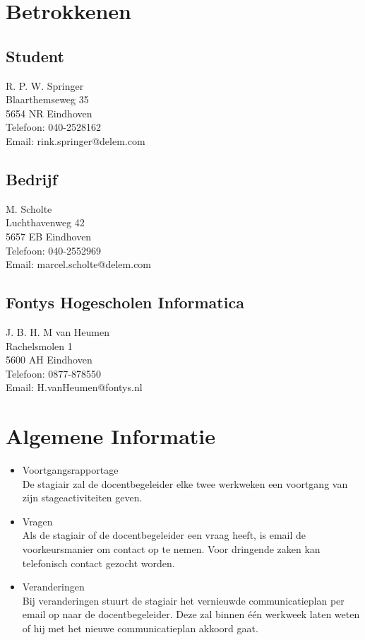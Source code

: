 
\section{Betrokkenen}

\subsection{Student}
R. P. W. Springer\\
Blaarthemseweg 35\\
5654 NR Eindhoven\\
Telefoon: 040-2528162\\
Email: rink.springer@delem.com

\subsection{Bedrijf}
M. Scholte\\
Luchthavenweg 42\\
5657 EB Eindhoven\\
Telefoon: 040-2552969\\
Email: marcel.scholte@delem.com

\subsection{Fontys Hogescholen Informatica}
J. B. H. M van Heumen \\
Rachelsmolen 1\\
5600 AH Eindhoven\\
Telefoon: 0877-878550\\
Email: H.vanHeumen@fontys.nl

\section[Algemeen]{Algemene Informatie}

\begin{itemize}
\item Voortgangsrapportage \\
De stagiair zal de docentbegeleider elke twee werkweken een voortgang van zijn stageactiviteiten geven.
\item Vragen \\
Als de stagiair of de docentbegeleider een vraag heeft, is email de voorkeursmanier om contact op te nemen. Voor dringende zaken kan telefonisch contact gezocht worden.
\item Veranderingen \\
Bij veranderingen stuurt de stagiair het vernieuwde communicatieplan per email op naar de docentbegeleider. Deze zal binnen \'e\'en werkweek laten weten of hij met het nieuwe communicatieplan akkoord gaat.
\end{itemize}

